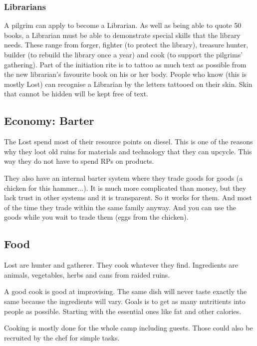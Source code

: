 \subsubsection{Librarians}

A pilgrim can apply to become a Librarian. As well as being able to quote 50 books, a Librarian must be able to demonstrate special skills that the library needs. These range from forger, fighter (to protect the library), treasure hunter, builder (to rebuild the library once a year) and cook (to support the pilgrims' gathering).
Part of the initiation rite is to tattoo as much text as possible from the new librarian's favourite book on his or her body. People who know (this is mostly Lost) can recognise a Librarian by the letters tattooed on their skin.
Skin that cannot be hidden will be kept free of text.

\subsection{Economy: Barter}
\label{sec:Barter}
The Lost spend most of their resource points on diesel. This is one of the reasons why they loot old ruins for materials and technology that they can upcycle. This way they do not have to spend RPs on products.

They also have an internal barter system where they trade goods for goods (a chicken for this hammer...).
It is much more complicated than money, but they lack trust in other systems and it is transparent. So it works for them. And most of the time they trade within the same family anyway.
And you can use the goods while you wait to trade them (eggs from the chicken).

\subsection{Food}
\label{sec: lost food}

Lost are hunter and gatherer. They cook whatever they find. Ingredients are animals, vegetables, herbs and cans from raided ruins.

A good cook is good at improvising. The same dish will never taste exactly the same because the ingredients will vary. Goals is to get as many nutritients into people as possible. Starting with the essential ones like fat and other calories.

Cooking is mostly done for the whole camp including guests. Those could also be recruited by the chef for simple tasks.




